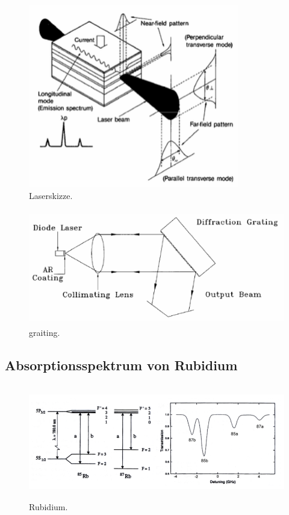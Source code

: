 \begin{figure}[H]
    \centering
    \includegraphics[height=8cm]{content/pics/laser.png}
    \caption{Laserskizze. \cite{V60}}
    \label{fig:laser}
\end{figure}

\begin{figure}[H]
    \centering
    \includegraphics[height=5cm]{content/pics/graiting.png}
    \caption{graiting. \cite{V60}}
    \label{fig:graiting}
\end{figure}

\subsection{Absorptionsspektrum von Rubidium}

\begin{figure}[H]
    \centering
    \includegraphics[height=5cm]{content/pics/Rubidium.png}
    \caption{Rubidium. \cite{V60}}
    \label{fig:rubidium}
\end{figure}

